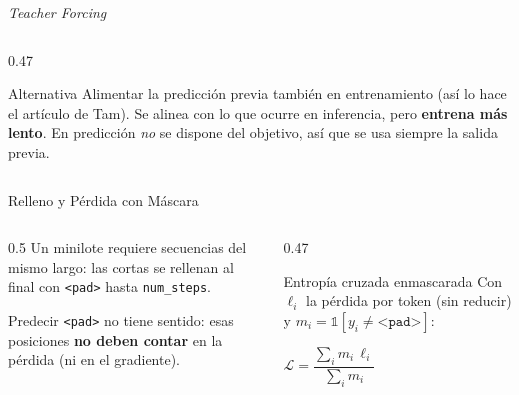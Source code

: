 \documentclass[aspectratio=169, 10pt]{beamer}
\newcommand{\tok}[1]{\texttt{#1}}
\newcommand{\formula}[1]{%
	\begin{tcolorbox}[colback=UCMBlue!8, colframe=UCMBlue, arc=4pt,
		boxsep=2pt, left=6pt, right=6pt, top=3pt, bottom=3pt]
		#1
	\end{tcolorbox}
}
\begin{document}
\begin{frame}{\textit{Teacher Forcing}}
\begin{columns}[T]
\begin{column}{0.47\textwidth}
			\vspace{0.3cm}

			\begin{alertblock}{Alternativa}
				\small
				Alimentar la predicci\'on previa tambi\'en en entrenamiento (as\'i lo hace el art\'iculo de Tam). Se alinea con lo que ocurre en inferencia, pero \textbf{entrena m\'as lento}. En predicci\'on \emph{no} se dispone del objetivo, as\'i que se usa siempre la salida previa.
			\end{alertblock}
		\end{column}
	\end{columns}

\end{frame}

\begin{frame}[fragile]{Relleno y P\'erdida con M\'ascara}

	\begin{columns}[T]
		\begin{column}{0.5\textwidth}
			\small
			Un minilote requiere secuencias del mismo largo: las cortas se rellenan al final con \tok{<pad>} hasta \texttt{num\_steps}.

			\vspace{0.1cm}
			\centering

			\raggedright
			\vspace{0.1cm}
			Predecir \tok{<pad>} no tiene sentido: esas posiciones \textbf{no deben contar} en la p\'erdida (ni en el gradiente).
		\end{column}

		\begin{column}{0.47\textwidth}
			\begin{block}{Entrop\'ia cruzada enmascarada}
				\small
				Con $\ell_i$ la p\'erdida por token (sin reducir) y $m_i = \mathbb{1}[y_i \neq \tok{<pad>}]$:
				\formula{\centering $\mathcal{L} = \dfrac{\sum_i m_i\,\ell_i}{\sum_i m_i}$}
			\end{block}


\end{column}
\end{columns}
\end{frame}
\end{document}
